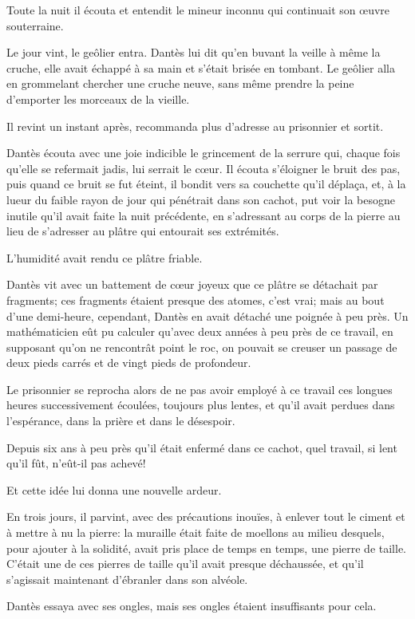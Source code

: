 Toute la nuit il écouta et entendit le mineur inconnu qui continuait son œuvre souterraine.

Le jour vint, le geôlier entra. Dantès lui dit qu'en buvant la veille à même la cruche, elle avait échappé à sa main et s'était brisée en tombant. Le geôlier alla en grommelant chercher une cruche neuve, sans même prendre la peine d'emporter les morceaux de la vieille.

Il revint un instant après, recommanda plus d'adresse au prisonnier et sortit.

Dantès écouta avec une joie indicible le grincement de la serrure qui, chaque fois qu'elle se refermait jadis, lui serrait le cœur. Il écouta s'éloigner le bruit des pas, puis quand ce bruit se fut éteint, il bondit vers sa couchette qu'il déplaça, et, à la lueur du faible rayon de jour qui pénétrait dans son cachot, put voir la besogne inutile qu'il avait faite la nuit précédente, en s'adressant au corps de la pierre au lieu de s'adresser au plâtre qui entourait ses extrémités.

L'humidité avait rendu ce plâtre friable.

Dantès vit avec un battement de cœur joyeux que ce plâtre se détachait par fragments; ces fragments étaient presque des atomes, c'est vrai; mais au bout d'une demi-heure, cependant, Dantès en avait détaché une poignée à peu près. Un mathématicien eût pu calculer qu'avec deux années à peu près de ce travail, en supposant qu'on ne rencontrât point le roc, on pouvait se creuser un passage de deux pieds carrés et de vingt pieds de profondeur.

Le prisonnier se reprocha alors de ne pas avoir employé à ce travail ces longues heures successivement écoulées, toujours plus lentes, et qu'il avait perdues dans l'espérance, dans la prière et dans le désespoir.

Depuis six ans à peu près qu'il était enfermé dans ce cachot, quel travail, si lent qu'il fût, n'eût-il pas achevé!

Et cette idée lui donna une nouvelle ardeur.

En trois jours, il parvint, avec des précautions inouïes, à enlever tout le ciment et à mettre à nu la pierre: la muraille était faite de moellons au milieu desquels, pour ajouter à la solidité, avait pris place de temps en temps, une pierre de taille. C'était une de ces pierres de taille qu'il avait presque déchaussée, et qu'il s'agissait maintenant d'ébranler dans son alvéole.

Dantès essaya avec ses ongles, mais ses ongles étaient insuffisants pour cela.

